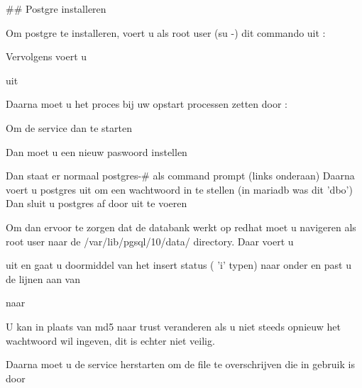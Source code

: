 \documentclass[fleqn,10pt]{artikeltin}
\begin{document}
{## Postgre installeren

Om postgre te installeren, voert u als root user (su -) dit commando uit :
 
   \par

Vervolgens voert u
  \par
  \par
  \par
uit

Daarna moet u het proces bij uw opstart processen zetten door :

 \par 

Om de service dan te starten
 \par

Dan moet u een nieuw paswoord instellen 
  \par
 
Dan staat er normaal postgres-# als command prompt (links onderaan)
Daarna voert u \password postgres uit om een wachtwoord in te stellen (in mariadb was dit 'dbo')
Dan sluit u postgres af door \q uit te voeren

Om dan ervoor te zorgen dat de databank werkt op redhat moet u navigeren als root user naar de 
/var/lib/pgsql/10/data/ directory.
Daar voert u 
  \par
  
uit en gaat u doormiddel van het insert status ( 'i' typen) naar onder en past u de lijnen aan van 
  \par
naar 
  \par
 
U kan in plaats van md5 naar trust veranderen als u niet steeds opnieuw het wachtwoord wil ingeven,
dit is echter niet veilig.

Daarna moet u de service herstarten om de file te overschrijven die in gebruik is door 
  \par

}
\end{document}
